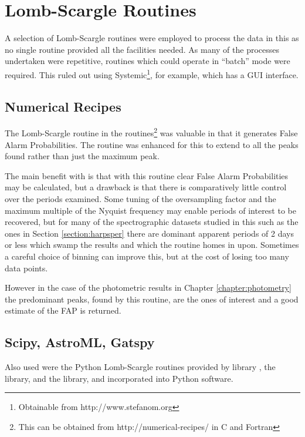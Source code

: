 \chapter{Lomb-Scargle Routines} %
\protect\label{chapter:lsroutines}

A selection of Lomb-Scargle routines were employed to process the data in this {\paperorthesis} as no single routine
provided all the facilities needed. As many of the processes undertaken were repetitive, routines which could operate in
``batch'' mode were required. This ruled out using Systemic\footnote{Obtainable from http://www.stefanom.org}, for
example, which has a GUI interface.

\section{Numerical Recipes}

The Lomb-Scargle routine in the {\numrecs} routines\footnote{This can be obtained from http://numerical-recipes/
  in C and Fortran} was valuable in that it generates False Alarm Probabilities. The routine was enhanced for this
{\paperorthesis} to extend to all the peaks found rather than just the maximum peak.

The main benefit with {\numrecs} is that with this routine clear False Alarm Probabilities may be calculated, but a
drawback is that there is comparatively little control over the periods examined. Some tuning of the oversampling factor
and the maximum multiple of the Nyquist frequency may enable periods of interest to be recovered, but for many of the
spectrographic datasets studied in this {\paperorthesis} such as the {\harps} ones in Section \ref{section:harpsper}
there are dominant apparent periods of 2 days or less which swamp the results and which the routine homes in
upon. Sometimes a careful choice of binning can improve this, but at the cost of losing too many data points.

However in the case of the photometric results in Chapter \ref{chapter:photometry} the predominant peaks, found by this
routine, are the ones of interest and a good estimate of the FAP is returned.

\section{Scipy, AstroML, Gatspy}

Also used were the Python Lomb-Scargle routines provided by {\scipy} library \citep{jones01}, the {\astroml} library,
\citep{vanderplas12} and the {\gatspy} library, \citep{vanderplas15} and incorporated into Python software.


